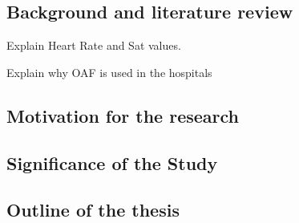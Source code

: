 \subsection{Background and literature review}

Explain Heart Rate and Sat values. 

Explain why OAF is used in the hospitals


\subsection{Motivation for the research}

\subsection{Significance of the Study}


\subsection{Outline of the thesis}



